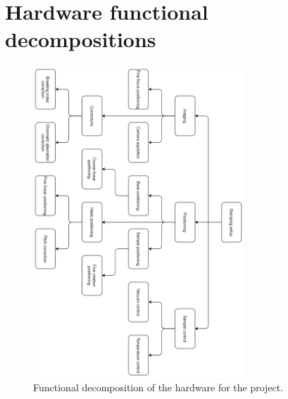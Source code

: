\documentclass[10pt]{article}
\begin{document}
\section{Hardware functional decompositions}
\label{ap:hardware_functional_decomposition}
\begin{figure}[htp]
  \centering
  \includegraphics[width=0.7\textwidth]{img/design_cycle/functional_decomposition_hardware.png}
  \caption{Functional decomposition of the hardware for the project.}
  \label{fig:functional_decomposition_hardware}
\end{figure}

\clearpage
\end{document}
